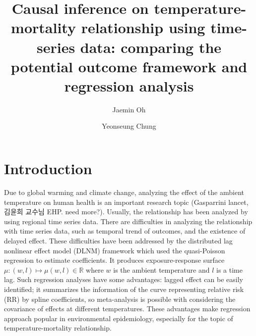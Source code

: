 \documentclass[12pt]{article}
\author[1]{Jaemin Oh}
\author[2]{Yeonseung Chung}
\affil[1,2]{Department of Mathematical Sciences, KAIST}
\title{
	Causal inference on temperature-mortality relationship using time-series data: 
	comparing the potential outcome framework and regression analysis
	} %
\begin{document}
\maketitle
\tableofcontents


\section{Introduction}

Due to global warming and climate change,
analyzing the effect of the ambient temperature on human health is an important research topic
\cite{gasparrini2017, yoonhee2019}(Gasparrini lancet, 김윤희 교수님 EHP. need more?).
Usually, the relationship has been analyzed by using regional time series data.
There are difficulties in analyzing the relationship with time series data, such as 
temporal trend of outcomes, and the existence of delayed effect.
These difficulties have been addressed by 
the distributed lag nonlinear effect model (DLNM) framework\cite{dlnm2010}
which used the quasi-Poisson regression\cite{quasipoisson} to estimate coefficients.
It produces exposure-response surface
$\mu : (w, l) \mapsto \mu(w,l) \in \mathbb{R}$ where $w$ is the ambient temperature and $l$ is a time lag.
Such regression analyses have some advantages:
lagged effect can be easily identified;
it summarizes the information of the curve representing relative risk (RR) by spline coefficients,
so meta-analysis is possible with considering the covariance of effects at different temperatures.
These advantages make regression approach popular in environmental epidemiology,
especially for the topic of temperature-mortality relationship.
\end{document}

